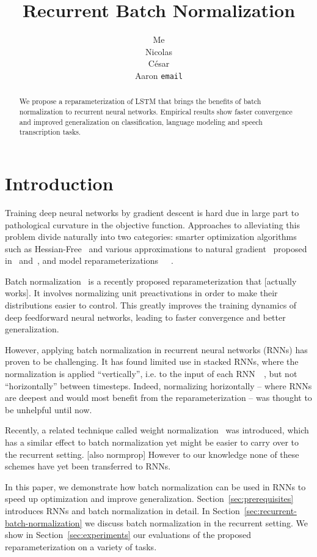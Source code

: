 \documentclass{article} %
\title{Recurrent Batch Normalization}
\author{
Me \\
\And
Nicolas \\
\And
C\'esar \\
\And
Aaron
\texttt{email} \\
}
\begin{document}
\maketitle

\begin{abstract}
We propose a reparameterization of LSTM that brings the benefits of batch normalization to recurrent neural networks.
Empirical results show faster convergence and improved generalization on classification, language modeling and speech transcription tasks.
\end{abstract}

\section{Introduction}

Training deep neural networks by gradient descent is hard due in large part to pathological curvature in the objective function.
Approaches to alleviating this problem divide naturally into two categories: smarter optimization algorithms such as
Hessian-Free~\cite{hessianfree} and various approximations to natural gradient~\cite{amari} proposed in~\cite{ollivier} and~\cite{KFAC},
and model reparameterizations~\cite{efficientbackprop}~\cite{raiko}~\cite{naturalneuralnetworks}.

Batch normalization~\cite{batchnorm} is a recently proposed reparameterization that [actually works].
It involves normalizing unit preactivations in order to make their distributions easier to control.
This greatly improves the training dynamics of deep feedforward neural networks, leading to faster convergence and better generalization.

However, applying batch normalization in recurrent neural networks (RNNs) has proven to be challenging.
It has found limited use in stacked RNNs, where the normalization is applied ``vertically'', i.e. to the input of each RNN~\cite{cesar}~\cite{baidu}, but not ``horizontally'' between timesteps.
Indeed, normalizing horizontally -- where RNNs are deepest and would most benefit from the reparameterization -- was thought to be unhelpful until now.

Recently, a related technique called weight normalization~\cite{weightnorm} was introduced, which has a similar effect to batch normalization yet might be easier to carry over to the recurrent setting.
[also normprop]
However to our knowledge none of these schemes have yet been transferred to RNNs.

In this paper, we demonstrate how batch normalization can be used in RNNs to speed up optimization and improve generalization.
Section~\ref{sec:prerequisites} introduces RNNs and batch normalization in detail.
In Section~\ref{sec:recurrent-batch-normalization} we discuss batch normalization in the recurrent setting.
We show in Section~\ref{sec:experiments} our evaluations of the proposed reparameterization on a variety of tasks.
\end{document}

